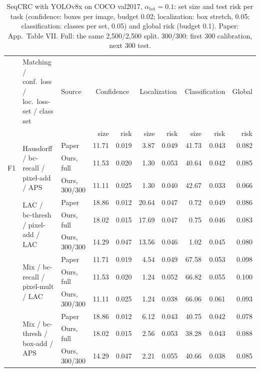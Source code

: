 \begin{table}[h]
\centering\footnotesize
\setlength{\tabcolsep}{3.2pt}
\caption{SeqCRC with YOLOv8x on COCO val2017, $\alpha_{\text{tot}}=0.1$: set size and test risk per task (confidence:
boxes per image, budget 0.02; localization: box stretch, 0.05; classification: classes per set, 0.05) and global risk
(budget 0.1). Paper: App.\ Table VII. Full: the same 2{,}500/2{,}500 split. 300/300: first 300 calibration, next 300 test.}
\label{tab:seqcrc}
\begin{tabular}{@{}l p{3.3cm} l rr rr rr r@{}}
\toprule
 & Matching / conf.\ loss / loc.\ loss-set / class set & Source & \multicolumn{2}{c}{Confidence} & \multicolumn{2}{c}{Localization} & \multicolumn{2}{c}{Classification} & Global \\
\cmidrule(lr){4-5}\cmidrule(lr){6-7}\cmidrule(lr){8-9}
 & & & size & risk & size & risk & size & risk & risk \\
\midrule
\multirow{3}{*}{F1} & \multirow{3}{*}{\parbox{3.3cm}{\raggedright Hausdorff / bc-recall / pixel-add / APS}} & Paper & 11.71 & 0.019 & 3.87 & 0.049 & 41.73 & 0.043 & 0.082 \\
 &  & Ours, full & 11.53 & 0.020 & 1.30 & 0.053 & 40.64 & 0.042 & 0.085 \\
 &  & Ours, 300/300 & 11.11 & 0.025 & 1.30 & 0.040 & 42.67 & 0.033 & 0.066 \\
\addlinespace[3pt]
\multirow{3}{*}{F2} & \multirow{3}{*}{\parbox{3.3cm}{\raggedright LAC / bc-thresh / pixel-add / LAC}} & Paper & 18.86 & 0.012 & 20.64 & 0.047 & 0.72 & 0.049 & 0.086 \\
 &  & Ours, full & 18.02 & 0.015 & 17.69 & 0.047 & 0.75 & 0.046 & 0.083 \\
 &  & Ours, 300/300 & 14.29 & 0.047 & 13.56 & 0.046 & 1.02 & 0.045 & 0.080 \\
\addlinespace[3pt]
\multirow{3}{*}{F3} & \multirow{3}{*}{\parbox{3.3cm}{\raggedright Mix / bc-recall / pixel-mult / LAC}} & Paper & 11.71 & 0.019 & 4.54 & 0.049 & 67.58 & 0.053 & 0.098 \\
 &  & Ours, full & 11.53 & 0.020 & 1.24 & 0.052 & 66.82 & 0.055 & 0.100 \\
 &  & Ours, 300/300 & 11.11 & 0.025 & 1.24 & 0.038 & 66.06 & 0.061 & 0.093 \\
\addlinespace[3pt]
\multirow{3}{*}{F4} & \multirow{3}{*}{\parbox{3.3cm}{\raggedright Mix / bc-thresh / box-add / APS}} & Paper & 18.86 & 0.012 & 6.12 & 0.043 & 40.75 & 0.042 & 0.078 \\
 &  & Ours, full & 18.02 & 0.015 & 2.56 & 0.053 & 38.28 & 0.043 & 0.088 \\
 &  & Ours, 300/300 & 14.29 & 0.047 & 2.21 & 0.055 & 40.66 & 0.038 & 0.085 \\
\bottomrule
\end{tabular}
\end{table}

